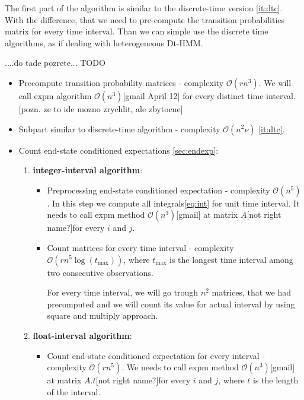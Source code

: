 \documentclass[thesis=M,english]{FITthesis}[2012/10/20]
\begin{document}
\begin{itemize}
The first part of the algorithm is similar to the discrete-time version \ref{it:dtc}. With the difference, that we need to pre-compute the transition probabilities matrix for every time interval. Than we can simple use the discrete time algorithms, as if dealing with heterogeneous Dt-HMM. 

....do tade pozrete... TODO %

\begin{itemize}\label{it:ctc}
\item Precompute transition probability matrices - complexity $\mathcal{O}(r n^3)$. We will call expm algorithm $\mathcal{O}(n^3)$[gmail April 12] for every distinct time interval. [pozn. ze to ide mozno zrychlit, ale zbytocne]
\item Subpart similar to discrete-time algorithm - complexity $\mathcal{O}(n^2 \nu)$ \ref{it:dtc}.
\item 

Count end-state conditioned expectations \ref{sec:endexp}:
\begin{enumerate}[resume]
\setcounter{enumi}{0}
\item \textbf{integer-interval algorithm}:

\begin{itemize}
\item Preprocessing end-state conditioned expectation - complexity $\mathcal{O}(n^5)$. 
    In this step we compute all integrals\eqref{eq:int} for unit time interval. It needs to call expm method $\mathcal{O}(n^3)$[gmail] at matrix $A$[not right name?]for every $i$ and $j$.   
\item Count matrices for every time interval - complexity $\mathcal{O}(r n^5\log(t_{\max}))$, where $t_{\max}$ is the longest time interval among two consecutive observations.

For every time interval, we will go trough $n^2$ matrices, that we had precomputed and we will count its value for actual interval by using square and multiply approach. 


\end{itemize}

\item \textbf{float-interval algorithm}: 
\begin{itemize}
\item Count end-state conditioned expectation for every interval - complexity $\mathcal{O}(r n^5)$. 
We needs to call expm method $\mathcal{O}(n^3)$[gmail] at matrix $A.t$[not right name?]for every $i$ and $j$, where $t$ is the length of the interval.
\end{itemize}


\end{enumerate}
\end{itemize}
\end{itemize}
\end{document}
